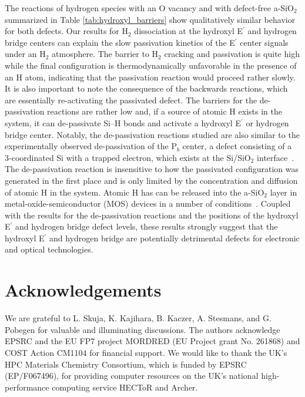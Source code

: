 \documentclass[aps,prb,reprint,superscriptaddress,showpacs]{revtex4-1}
\begin{document}
The reactions of hydrogen species with an O vacancy and with defect-free a-SiO$_2$ summarized in Table \ref{tab:hydroxyl_barriers} show qualitatively similar behavior for both defects. Our results for H$_2$ dissociation at the hydroxyl E$^\prime$ and hydrogen bridge centers can explain the slow passivation kinetics of the E$^\prime$ center signals under an H$_2$ atmosphere. The barrier to H$_2$ cracking and passivation is quite high while the final configuration is thermodynamically unfavorable in the presence of an H atom, indicating that the passivation reaction would proceed rather slowly. It is also important to note the consequence of the backwards reactions, which are essentially re-activating the passivated defect. The barriers for the de-passivation reactions are rather low and, if a source of atomic H exists in the system, it can de-passivate \mbox{Si--H} bonds and activate a hydroxyl E$^\prime$ or hydrogen bridge center. Notably, the de-passivation reactions studied are also similar to the experimentally observed de-passivation of the P$_b$ center, a defect consisting of a 3-coordinated Si with a trapped electron, which exists at the Si/SiO$_2$ interface~\cite{cartier_depassivation}. The de-passivation reaction is insensitive to how the passivated configuration was generated in the first place and is only limited by the concentration and diffusion of atomic H in the system. Atomic H has can be released into the a-SiO$_2$ layer in metal-oxide-semiconductor (MOS) devices in a number of conditions~\cite{h_gate1,h_gate2,poindexter_hydrogenous}. Coupled with the results for the de-passivation reactions and the positions of the hydroxyl E$^\prime$ and hydrogen bridge defect levels, these results strongly suggest that the hydroxyl E$^\prime$ and hydrogen bridge are potentially detrimental defects for electronic and optical technologies.

\section{Acknowledgements}
We are grateful to L. Skuja, K. Kajihara, B. Kaczer, A. Stesmans, and G. Pobegen for valuable and illuminating discussions. The authors acknowledge EPSRC and the EU FP7 project MORDRED (EU Project grant No. 261868) and COST Action CM1104 for financial support. We would like to thank the UK's HPC Materials Chemistry Consortium, which is funded by EPSRC (EP/F067496), for providing computer resources on the UK's national high-performance computing service HECToR and Archer. 


\end{document}
